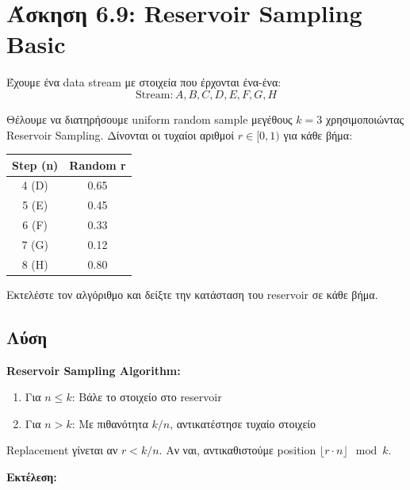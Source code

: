 \section{Άσκηση 6.9: Reservoir Sampling Basic}

\begin{formulabox}[Εκφώνηση]
Έχουμε ένα data stream με στοιχεία που έρχονται ένα-ένα:
$$\text{Stream}: A, B, C, D, E, F, G, H$$

Θέλουμε να διατηρήσουμε uniform random sample μεγέθους $k = 3$ χρησιμοποιώντας
Reservoir Sampling. Δίνονται οι τυχαίοι αριθμοί $r \in [0,1)$ για κάθε βήμα:

\begin{center}
\begin{tabular}{cc}
\toprule
\textbf{Step (n)} & \textbf{Random r} \\
\midrule
4 (D) & 0.65 \\
5 (E) & 0.45 \\
6 (F) & 0.33 \\
7 (G) & 0.12 \\
8 (H) & 0.80 \\
\bottomrule
\end{tabular}
\end{center}

Εκτελέστε τον αλγόριθμο και δείξτε την κατάσταση του reservoir σε κάθε βήμα.
\end{formulabox}

\subsection*{Λύση}

\textbf{Reservoir Sampling Algorithm:}
\begin{enumerate}
    \item Για $n \leq k$: Βάλε το στοιχείο στο reservoir
    \item Για $n > k$: Με πιθανότητα $k/n$, αντικατέστησε τυχαίο στοιχείο
\end{enumerate}

Replacement γίνεται αν $r < k/n$. Αν ναι, αντικαθιστούμε position $\lfloor r \cdot n \rfloor \mod k$.

\textbf{Εκτέλεση:}

